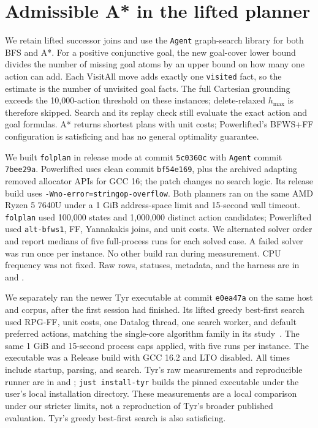 \documentclass[10pt,a4paper]{article}
\begin{document}
\section{Admissible A* in the lifted planner}
We retain lifted successor joins and use the \texttt{Agent} graph-search
library for both BFS and A*. For a positive conjunctive goal, the new
goal-cover lower bound divides the number of missing goal atoms by an upper
bound on how many one action can add. Each VisitAll move adds exactly one
\texttt{visited} fact, so the estimate is the number of unvisited goal facts.
The full Cartesian grounding exceeds the 10,000-action threshold on these
instances; delete-relaxed $h_{\max}$ is therefore skipped. Search and its
replay check still evaluate the exact action and goal formulas. A* returns
shortest plans with unit costs; Powerlifted's BFWS+FF configuration is
satisficing and has no general optimality guarantee.

We built \texttt{folplan} in release mode at commit \texttt{5c0360c} with
\texttt{Agent} commit \texttt{7bee29a}. Powerlifted uses clean commit
\texttt{bf54e169}, plus the archived
 adapting removed allocator
APIs for GCC 16; the patch changes no search logic. Its release build uses
\texttt{-Wno-error=stringop-overflow}. Both planners ran on the same AMD
Ryzen 5 7640U under a 1 GiB address-space limit and 15-second wall timeout.
\texttt{folplan} used 100,000 states and 1,000,000 distinct action candidates;
Powerlifted used \texttt{alt-bfws1}, FF, Yannakakis joins, and unit costs.
We alternated solver order and report medians of five full-process runs for
each solved case. A failed solver was run once per instance. No other build
ran during measurement. CPU frequency was not fixed. Raw rows, statuses,
metadata, and the harness are in
 and
.

We separately ran the newer Tyr executable at commit \texttt{e0ea47a} on
the same host and corpus, after the first session had finished. Its lifted
greedy best-first search used RPG-FF, unit costs, one Datalog thread, one
search worker, and default preferred actions, matching the single-core
algorithm family in its study~\cite{tyr2026}. The same 1 GiB and 15-second
process caps applied, with five runs per instance. The executable was a
Release build with GCC 16.2 and LTO disabled. All times include startup,
parsing, and search. Tyr's raw measurements and reproducible runner are in
 and
; \texttt{just install-tyr} builds the
pinned executable under the user's local installation directory. These
measurements are a local
comparison under our stricter limits, not a reproduction of Tyr's broader
published evaluation. Tyr's greedy best-first search is also satisficing.
\end{document}

